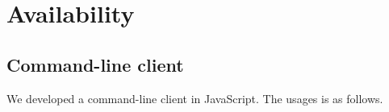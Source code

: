 \documentclass[runningheads]{llncs}
\begin{document}

\section{Availability}
\subsection{Command-line client}
We developed a command-line client in JavaScript.
The usages is as follows.
\end{document}
